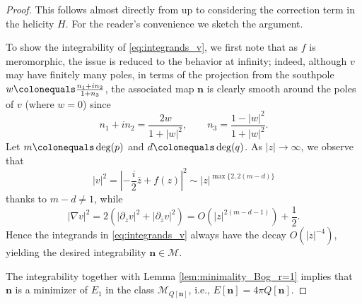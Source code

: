 \documentclass{amsart}
\numberwithin{equation}{section}
\theoremstyle{definition}
\theoremstyle{remark}
\newcommand{\boM}{\mathcal{M}}
\newcommand{\ovl}[1]{\overline{#1}}					%
\newcommand{\rd}{{\partial}}								%
\newcommand{\nab}{{\nabla}}							%
\newcommand{\bn}{{\mathbf{n}}}
\begin{document}
\begin{proof}
    This follows almost directly from \cite[Lemma 4.2]{MR4091507} up to considering the correction term in the helicity $H$.
    For the reader's convenience we sketch the argument.

    To show the integrability of \eqref{eq:integrands_v}, we first note that as $f$ is meromorphic, the issue is reduced to the behavior at infinity; indeed, although $v$ may have finitely many poles, in terms of the projection from the southpole $w\colonequals \frac{n_1+in_2}{1+n_3}$, 
    the associated map $\bn$ is clearly smooth around the poles of $v$ (where $w=0$) since
    \[
    n_1+in_2=\frac{2w}{1+|w|^2}, \qquad n_3=\frac{1-|w|^2}{1+|w|^2}.
    \]
    Let $m\colonequals \deg(p)$ and $d\colonequals \deg(q)$.
    As $|z|\to\infty$, we observe that
    \[
    |v|^2 =\left|-\frac{i}2\ovl{z} +f(z)\right|^2 \sim |z|^{\max\{2,2(m-d)\}}
    \]
    thanks to $m-d\neq1$, while
    \[
    |\nabla v|^2=2(|\rd_z v|^2 + |\rd_{\ovl z}v|^2)=O(|z|^{2(m-d-1)})+\frac{1}{2}.
    \]
    Hence the integrands in \eqref{eq:integrands_v} always have the decay $O(|z|^{-4})$, yielding the desired integrability $\bn\in\boM$.

    The integrability together with Lemma \ref{lem:minimality_Bog_r=1} implies that $\bn$ is a minimizer of $E_1$ in the class $\boM_{Q[\bn]}$, i.e., $E[\bn]=4\pi Q[\bn]$.


\end{proof}
\end{document}
